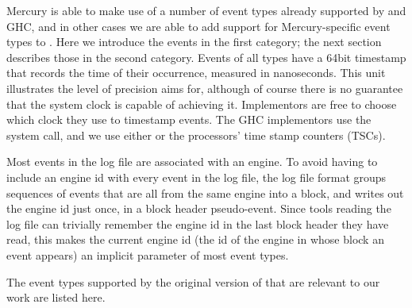 Mercury is able to make use of a number of event types already supported by
\tscope and GHC,
and in other cases we are able to add support for Mercury-specific event
types to \tscope.
Here we introduce the events in the first category;
the next section describes those in the second category.
Events of all types have a 64bit timestamp
that records the time of their occurrence, measured in nanoseconds.
This unit illustrates the level of precision \tscope aims for,
although of course there is no guarantee
that the system clock is capable of achieving it.
Implementors are free to choose which clock they use to timestamp events.
The GHC implementors use the  system call,
and we use either  or the processors' time stamp
counters (TSCs).

Most events in the log file are associated with an engine.
To avoid having to include an engine id with every event in the log file,
the log file format
groups sequences of events that are all from the same engine into a block,
and writes out the engine id just once, in a block header pseudo-event.
Since tools reading the log file can trivially remember
the engine id in the last block header they have read,
this makes the current engine id
(the id of the engine in whose block an event appears)
an implicit parameter of most event types.

The event types supported by the original version of \tscope
that are relevant to our work are listed here.

